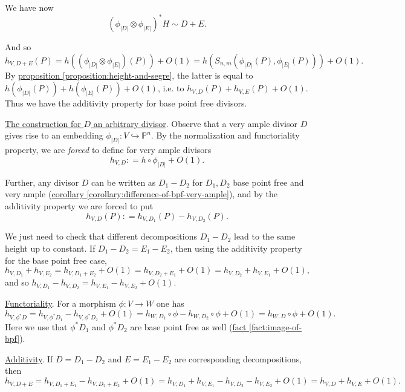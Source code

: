 \documentclass{article}
\newcommand{\refref}[2]{\hyperref[#2]{#1 \ref*{#2}}}
\theoremstyle{definition}
\newcommand{\dfn}{\mathrel{\mathop:}=}
\newcommand{\PP}{\mathbb{P}}
\begin{document}
We have now
$$(\phi_{|D|}\otimes \phi_{|E|})^* H \sim D + E.$$

And so
\[ h_{V,D+E} (P) =
  h ((\phi_{|D|}\otimes \phi_{|E|}) (P) ) + O (1) =
  h (S_{n,m} (\phi_{|D|} (P), \phi_{|E|} (P))) + O (1). \]
By \refref{proposition}{proposition:height-and-segre}, the latter is equal to
$h (\phi_{|D|} (P)) + h (\phi_{|E|} (P)) + O (1)$, i.e. to
$h_{V,D} (P) + h_{V,E} (P) + O (1)$. Thus we have the additivity property for
base point free divisors.

\vspace{1em}

\noindent\underline{The construction for $D$ an arbitrary divisor}. Observe that
a very ample divisor $D$ gives rise to an embedding
$\phi_{|D|}\colon V\hookrightarrow \PP^n$. By the normalization and
functoriality property, we are \emph{forced} to define for very ample divisors
$$h_{V,D} \dfn h\circ \phi_{|D|} + O (1).$$

Further, any divisor $D$ can be written as $D_1 - D_2$ for $D_1,D_2$ base point
free and very ample
(\refref{corollary}{corollary:difference-of-bpf-very-ample}), and by the
additivity property we are forced to put
$$h_{V,D} (P) \dfn h_{V,D_1} (P) - h_{V,D_2} (P).$$

We just need to check that different decompositions $D_1 - D_2$ lead to the same
height up to constant. If $D_1 - D_2 = E_1 - E_2$, then using the additivity
property for the base point free case,
\[ h_{V,D_1} + h_{V,E_2} =
  h_{V,D_1+E_2} + O(1) =
  h_{V,D_2+E_1} + O (1) =
  h_{V,D_2} + h_{V,E_1} + O (1), \]
and so $h_{V,D_1} - h_{V,D_2} = h_{V,E_1} - h_{V,E_2} + O (1)$.

\vspace{1em}

\noindent\underline{Functoriality}. For a morphism $\phi\colon V\to W$ one has
\[ h_{V,\phi^* D} = h_{V,\phi^* D_1} - h_{V,\phi^* D_2} + O (1) =
  h_{W,D_1}\circ\phi - h_{W,D_2}\circ\phi + O(1) =
  h_{W,D}\circ \phi + O (1). \]
Here we use that $\phi^* D_1$ and $\phi^* D_2$ are base point free as well
(\refref{fact}{fact:image-of-bpf}).

\vspace{1em}

\noindent\underline{Additivity}. If $D = D_1 - D_2$ and $E = E_1 - E_2$ are
corresponding decompositions, then
\[ h_{V,D+E} = h_{V,D_1+E_1} - h_{V,D_2+E_2} + O (1) =
  h_{V,D_1} + h_{V,E_1} - h_{V,D_2} - h_{V,E_2} + O (1) =
  h_{V,D} + h_{V,E} + O (1). \]

\vspace{1em}
\end{document}

